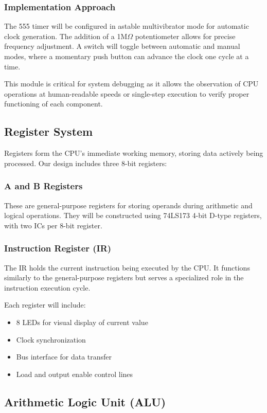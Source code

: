 \documentclass[a4paper,12pt]{article}
\begin{document}
\subsubsection{Implementation Approach}
The 555 timer will be configured in astable multivibrator mode for automatic clock generation. The addition of a 1M$\Omega$ potentiometer allows for precise frequency adjustment. A switch will toggle between automatic and manual modes, where a momentary push button can advance the clock one cycle at a time.

This module is critical for system debugging as it allows the observation of CPU operations at human-readable speeds or single-step execution to verify proper functioning of each component.

\subsection{Register System}

Registers form the CPU's immediate working memory, storing data actively being processed. Our design includes three 8-bit registers:

\subsubsection{A and B Registers}
These are general-purpose registers for storing operands during arithmetic and logical operations. They will be constructed using 74LS173 4-bit D-type registers, with two ICs per 8-bit register.

\subsubsection{Instruction Register (IR)}
The IR holds the current instruction being executed by the CPU. It functions similarly to the general-purpose registers but serves a specialized role in the instruction execution cycle.

Each register will include:
\begin{itemize}
    \item 8 LEDs for visual display of current value
    \item Clock synchronization
    \item Bus interface for data transfer
    \item Load and output enable control lines
\end{itemize}

\subsection{Arithmetic Logic Unit (ALU)}
\end{document}
